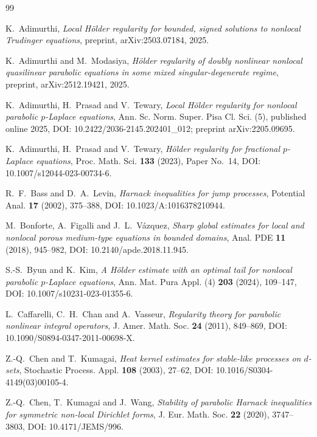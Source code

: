 \documentclass[10pt]{amsart}
\theoremstyle{plain}
\theoremstyle{definition}
\theoremstyle{remark}
\numberwithin{equation}{section}
\begin{document}
\begin{thebibliography}{99}

K.~Adimurthi,
\emph{Local H\"older regularity for bounded, signed solutions to
nonlocal Trudinger equations},
preprint, arXiv:2503.07184, 2025.

K.~Adimurthi and M.~Modasiya,
\emph{H\"older regularity of doubly nonlinear nonlocal quasilinear
parabolic equations in some mixed singular-degenerate regime},
preprint, arXiv:2512.19421, 2025.

K.~Adimurthi, H.~Prasad and V.~Tewary,
\emph{Local H\"older regularity for nonlocal parabolic $p$-Laplace equations},
Ann. Sc. Norm. Super. Pisa Cl. Sci. (5), published online 2025,
DOI: 10.2422/2036-2145.202401\_012;
preprint arXiv:2205.09695.

K.~Adimurthi, H.~Prasad and V.~Tewary,
\emph{H\"older regularity for fractional $p$-Laplace equations},
Proc. Math. Sci. \textbf{133} (2023), Paper No.~14,
DOI: 10.1007/s12044-023-00734-6.

R.~F.~Bass and D.~A.~Levin,
\emph{Harnack inequalities for jump processes},
Potential Anal. \textbf{17} (2002), 375--388,
DOI: 10.1023/A:1016378210944.

M.~Bonforte, A.~Figalli and J.~L.~V\'azquez,
\emph{Sharp global estimates for local and nonlocal porous medium-type
equations in bounded domains},
Anal. PDE \textbf{11} (2018), 945--982,
DOI: 10.2140/apde.2018.11.945.

S.-S.~Byun and K.~Kim,
\emph{A H\"older estimate with an optimal tail for nonlocal parabolic
$p$-Laplace equations},
Ann. Mat. Pura Appl. (4) \textbf{203} (2024), 109--147,
DOI: 10.1007/s10231-023-01355-6.

L.~Caffarelli, C.~H.~Chan and A.~Vasseur,
\emph{Regularity theory for parabolic nonlinear integral operators},
J. Amer. Math. Soc. \textbf{24} (2011), 849--869,
DOI: 10.1090/S0894-0347-2011-00698-X.

Z.-Q.~Chen and T.~Kumagai,
\emph{Heat kernel estimates for stable-like processes on $d$-sets},
Stochastic Process. Appl. \textbf{108} (2003), 27--62,
DOI: 10.1016/S0304-4149(03)00105-4.

Z.-Q.~Chen, T.~Kumagai and J.~Wang,
\emph{Stability of parabolic Harnack inequalities for symmetric
non-local Dirichlet forms},
J. Eur. Math. Soc. \textbf{22} (2020), 3747--3803,
DOI: 10.4171/JEMS/996.


\end{thebibliography}
\end{document}
